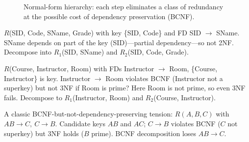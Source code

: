 \begin{figure}[h]
\centering
{}
\caption{Normal-form hierarchy: each step eliminates a class of redundancy at the possible cost of dependency preservation (BCNF).}
\label{fig:nf-hierarchy}
\end{figure}

\begin{example}[2NF violation]
$R$(SID, Code, SName, Grade) with key \{SID, Code\} and FD SID $\to$ SName. SName depends on part of the key (SID)---partial dependency---so not 2NF. Decompose into $R_1$(SID, SName) and $R_2$(SID, Code, Grade).
\end{example}

\begin{example}[3NF vs.\ BCNF]
$R$(Course, Instructor, Room) with FDs Instructor $\to$ Room, \{Course, Instructor\} is key. Instructor $\to$ Room violates BCNF (Instructor not a superkey) but not 3NF if Room is prime? Here Room is not prime, so even 3NF fails. Decompose to $R_1$(Instructor, Room) and $R_2$(Course, Instructor).
\end{example}

A classic BCNF-but-not-dependency-preserving tension: $R(A,B,C)$ with $AB\to C,\ C\to B$. Candidate keys $AB$ and $AC$; $C\to B$ violates BCNF ($C$ not superkey) but 3NF holds ($B$ prime). BCNF decomposition loses $AB\to C$.

